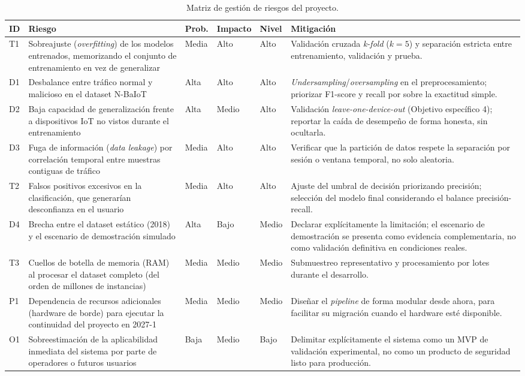 \documentclass[11pt,a4paper]{article}
\begin{document}
\begin{table}[H]
\centering
\caption{Matriz de gestión de riesgos del proyecto.}
\label{tab:riesgos}
\scriptsize
\begin{tabularx}{\textwidth}{p{0.55cm} X p{1.1cm} p{1.1cm} p{1.1cm} X}
\toprule
\textbf{ID} & \textbf{Riesgo} & \textbf{Prob.} & \textbf{Impacto} & \textbf{Nivel} & \textbf{Mitigación} \\
\midrule
T1 & Sobreajuste (\textit{overfitting}) de los modelos entrenados, memorizando el conjunto de entrenamiento en vez de generalizar & Media & Alto & \cellcolor{red!25}Alto & Validación cruzada \textit{k-fold} ($k=5$) y separación estricta entre entrenamiento, validación y prueba. \\
D1 & Desbalance entre tráfico normal y malicioso en el dataset N-BaIoT & Alta & Alto & \cellcolor{red!25}Alto & \textit{Undersampling}/\textit{oversampling} en el preprocesamiento; priorizar F1-score y recall por sobre la exactitud simple. \\
D2 & Baja capacidad de generalización frente a dispositivos IoT no vistos durante el entrenamiento & Alta & Medio & \cellcolor{red!25}Alto & Validación \textit{leave-one-device-out} (Objetivo específico 4); reportar la caída de desempeño de forma honesta, sin ocultarla. \\
D3 & Fuga de información (\textit{data leakage}) por correlación temporal entre muestras contiguas de tráfico & Media & Alto & \cellcolor{red!25}Alto & Verificar que la partición de datos respete la separación por sesión o ventana temporal, no solo aleatoria. \\
T2 & Falsos positivos excesivos en la clasificación, que generarían desconfianza en el usuario & Media & Alto & \cellcolor{red!25}Alto & Ajuste del umbral de decisión priorizando precisión; selección del modelo final considerando el balance precisión-recall. \\
D4 & Brecha entre el dataset estático (2018) y el escenario de demostración simulado & Alta & Bajo & \cellcolor{yellow!35}Medio & Declarar explícitamente la limitación; el escenario de demostración se presenta como evidencia complementaria, no como validación definitiva en condiciones reales. \\
T3 & Cuellos de botella de memoria (RAM) al procesar el dataset completo (del orden de millones de instancias) & Media & Medio & \cellcolor{yellow!35}Medio & Submuestreo representativo y procesamiento por lotes durante el desarrollo. \\
P1 & Dependencia de recursos adicionales (hardware de borde) para ejecutar la continuidad del proyecto en 2027-1 & Media & Medio & \cellcolor{yellow!35}Medio & Diseñar el \textit{pipeline} de forma modular desde ahora, para facilitar su migración cuando el hardware esté disponible. \\
O1 & Sobreestimación de la aplicabilidad inmediata del sistema por parte de operadores o futuros usuarios & Baja & Medio & \cellcolor{green!25}Bajo & Delimitar explícitamente el sistema como un MVP de validación experimental, no como un producto de seguridad listo para producción. \\
\bottomrule
\end{tabularx}
\end{table}
\end{document}
